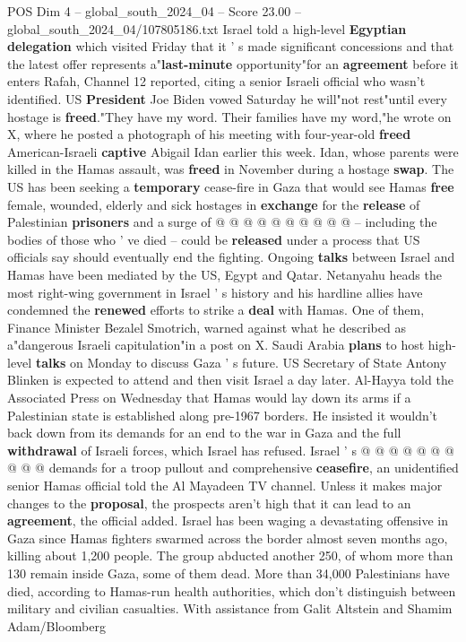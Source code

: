 \begin{textsample}{POS Dim 4 – global\_south\_2024\_04 – Score 23.00 – global\_south\_2024\_04/107805186.txt}
Israel told a high-level \textbf{Egyptian} \textbf{delegation} which visited Friday that it ' s made significant concessions and that the latest offer represents a"\textbf{last-minute} opportunity"for an \textbf{agreement} before it enters Rafah, Channel 12 reported, citing a senior Israeli official who wasn't identified.
US \textbf{President} Joe Biden vowed Saturday he will"not rest"until every hostage is \textbf{freed}."They have my word.
Their families have my word,"he wrote on X, where he posted a photograph of his meeting with four-year-old \textbf{freed} American-Israeli \textbf{captive} Abigail Idan earlier this week.
Idan, whose parents were killed in the Hamas assault, was \textbf{freed} in November during a hostage \textbf{swap}.
The US has been seeking a \textbf{temporary} cease-fire in Gaza that would see Hamas \textbf{free} female, wounded, elderly and sick hostages in \textbf{exchange} for the \textbf{release} of Palestinian \textbf{prisoners} and a surge of @ @ @ @ @ @ @ @ @ @ -- including the bodies of those who ' ve died -- could be \textbf{released} under a process that US officials say should eventually end the fighting.
Ongoing \textbf{talks} between Israel and Hamas have been mediated by the US, Egypt and Qatar.
Netanyahu heads the most right-wing government in Israel ' s history and his hardline allies have condemned the \textbf{renewed} efforts to strike a \textbf{deal} with Hamas.
One of them, Finance Minister Bezalel Smotrich, warned against what he described as a"dangerous Israeli capitulation"in a post on X.
Saudi Arabia \textbf{plans} to host high-level \textbf{talks} on Monday to discuss Gaza ' s future.
US Secretary of State Antony Blinken is expected to attend and then visit Israel a day later.
Al-Hayya told the Associated Press on Wednesday that Hamas would lay down its arms if a Palestinian state is established along pre-1967 borders.
He insisted it wouldn't back down from its demands for an end to the war in Gaza and the full \textbf{withdrawal} of Israeli forces, which Israel has refused.
Israel ' s @ @ @ @ @ @ @ @ @ @ demands for a troop pullout and comprehensive \textbf{ceasefire}, an unidentified senior Hamas official told the Al Mayadeen TV channel.
Unless it makes major changes to the \textbf{proposal}, the prospects aren't high that it can lead to an \textbf{agreement}, the official added.
Israel has been waging a devastating offensive in Gaza since Hamas fighters swarmed across the border almost seven months ago, killing about 1,200 people.
The group abducted another 250, of whom more than 130 remain inside Gaza, some of them dead.
More than 34,000 Palestinians have died, according to Hamas-run health authorities, which don't distinguish between military and civilian casualties.
With assistance from Galit Altstein and Shamim Adam/Bloomberg

\end{textsample}

